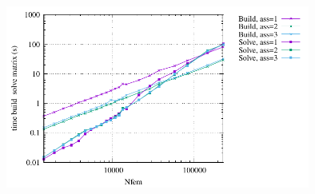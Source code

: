 \begin{center}
\includegraphics[width=10cm]{python_codes/fieldstone_182/RESULTS/times_build_solve.pdf}
\end{center}


